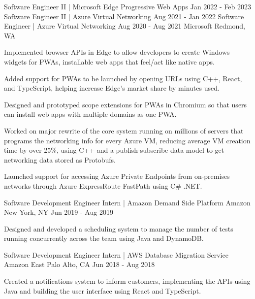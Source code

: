 \begin{cventries}
    \cventrythreepositions
    {Software Engineer II | Microsoft Edge Progressive Web Apps}
    {Jan 2022 - Feb 2023}
    {Software Engineer II | Azure Virtual Networking}
    {Aug 2021 - Jan 2022}
    {Software Engineer | Azure Virtual Networking}
    {Aug 2020 - Aug 2021}
    {Microsoft}
    {Redmond, WA}
    {
        \begin{cvitems} %
            \item {Implemented browser APIs in Edge to allow developers to create Windows widgets for PWAs, installable web apps that feel/act like native apps.}
            \item {Added support for PWAs to be launched by opening URLs using C++, React, and TypeScript, helping increase Edge's market share by minutes used.}
            \item {Designed and prototyped scope extensions for PWAs in Chromium so that users can install web apps with multiple domains as one PWA.}
        \end{cvitems}
    }
    {
        \begin{cvitems} %
            \item {Worked on major rewrite of the core system running on millions of servers that programs the networking info for every Azure VM, reducing average VM creation time by over 25\%, using C++ and a publish-subscribe data model to get networking data stored as Protobufs.}
            \item {Launched support for accessing Azure Private Endpoints from on-premises networks through Azure ExpressRoute FastPath using C\# .NET.}
        \end{cvitems}
    }

    \cventry
    {Software Development Engineer Intern | Amazon Demand Side Platform} %
    {Amazon} %
    {New York, NY} %
    {Jun 2019 - Aug 2019} %
    {
        \begin{cvitems} %
            \item {Designed and developed a scheduling system to manage the number of tests running concurrently across the team using Java and DynamoDB.}
        \end{cvitems}
    }

    \cventry
    {Software Development Engineer Intern | AWS Database Migration Service} %
    {Amazon} %
    {East Palo Alto, CA} %
    {Jun 2018 - Aug 2018} %
    {
        \begin{cvitems} %
            \item {Created a notifications system to inform customers, implementing the APIs using Java and building the user interface using React and TypeScript.}
        \end{cvitems}
    }

\end{cventries}
